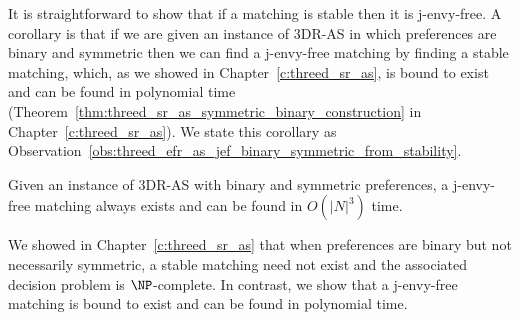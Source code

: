 It is straightforward to show that if a matching is stable then it is j-envy-free. A corollary is that if we are given an instance of 3DR-AS in which preferences are binary and symmetric then we can find a j-envy-free matching by finding a stable matching, which, as we showed in Chapter~\ref{c:threed_sr_as}, is bound to exist and can be found in polynomial time (Theorem~\ref{thm:threed_sr_as_symmetric_binary_construction} in Chapter~\ref{c:threed_sr_as}). We state this corollary as Observation~\ref{obs:threed_efr_as_jef_binary_symmetric_from_stability}.

\begin{observation}
\label{obs:threed_efr_as_jef_binary_symmetric_from_stability}
Given an instance of 3DR-AS with binary and symmetric preferences, a j-envy-free matching always exists and can be found in $O(|N|^3)$ time.
\end{observation}

We showed in Chapter~\ref{c:threed_sr_as} that when preferences are binary but not necessarily symmetric, a stable matching need not exist and the associated decision problem is $\NP$-complete. In contrast, we show that a j-envy-free matching is bound to exist and can be found in polynomial time.

